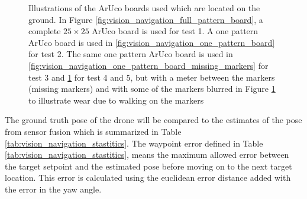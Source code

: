 \documentclass[../Head/report.tex]{subfiles}
\begin{document}
\begin{figure}[H]
\begin{subfigure}[t]{.20\textwidth}
        \caption{}
        \label{fig:vision_navigation_one_pattern_board_missing_markers_wear}
    \end{subfigure}
    \caption{Illustrations of the ArUco boards used which are located on the ground. In Figure \ref{fig:vision_navigation_full_pattern_board}, a complete $25 \times 25$ ArUco board is used for test 1. A one pattern ArUco board is used in \ref{fig:vision_navigation_one_pattern_board} for test 2. The same one pattern ArUco board is used in \ref{fig:vision_navigation_one_pattern_board_missing_markers} for test 3 and \ref{fig:vision_navigation_one_pattern_board_missing_markers_wear} for test 4 and 5, but with a meter between the markers (missing markers) and with some of the markers blurred in Figure \ref{fig:vision_navigation_one_pattern_board_missing_markers_wear} to illustrate wear due to walking on the markers}  
    \label{fig:vision_navigation_boards}
\end{figure}

The ground truth pose of the drone will be compared to the estimates of the pose from sensor fusion which is summarized in Table \ref{tab:vision_navigation_stastitics}. The waypoint error defined in Table \ref{tab:vision_navigation_stastitics}, means the maximum allowed error between the target setpoint and the estimated pose before moving on to the next target location. This error is calculated using the euclidean error distance added with the error in the yaw angle.  
\end{document}
